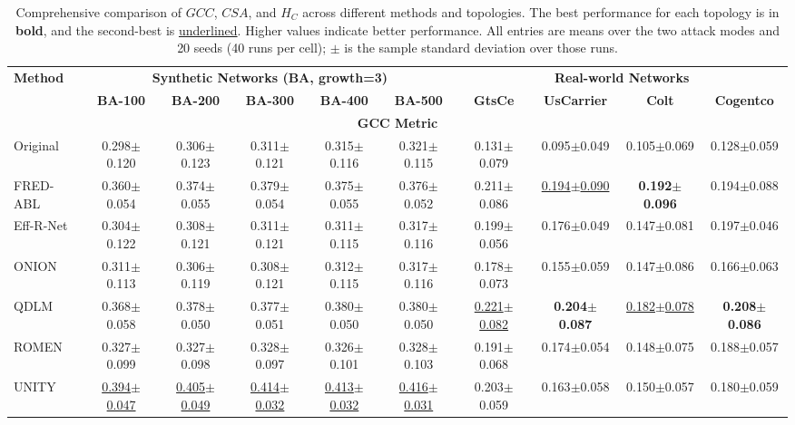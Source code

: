 \begin{table}[!ht]
\centering
\footnotesize
\setlength{\tabcolsep}{1.5pt}
\caption{Comprehensive comparison of $GCC$, $CSA$, and $H_C$ across different methods and topologies. The best performance for each topology is in \textbf{bold}, and the second-best is \underline{underlined}. Higher values indicate better performance. All entries are means over the two attack modes and 20 seeds (40 runs per cell); $\pm$ is the sample standard deviation over those runs.}
\label{tab:comprehensive_comparison}
\begin{tabular*}{\textwidth}{@{}l @{\extracolsep{\fill}} *{9}{c} @{}}
\toprule
\multirow{2}{*}{\textbf{Method}} & \multicolumn{5}{c}{\textbf{Synthetic Networks (BA, growth=3)}} & \multicolumn{4}{c}{\textbf{Real-world Networks}} \\
\cmidrule(lr){2-6} \cmidrule(l){7-10}
& \textbf{BA-100} & \textbf{BA-200} & \textbf{BA-300} & \textbf{BA-400} & \textbf{BA-500} & \textbf{GtsCe} & \textbf{UsCarrier} & \textbf{Colt} & \textbf{Cogentco} \\
\midrule
\multicolumn{10}{c}{\textbf{GCC Metric}} \\
\midrule
Original & 0.298$\pm$0.120 & 0.306$\pm$0.123 & 0.311$\pm$0.121 & 0.315$\pm$0.116 & 0.321$\pm$0.115 & 0.131$\pm$0.079 & 0.095$\pm$0.049 & 0.105$\pm$0.069 & 0.128$\pm$0.059 \\
FRED-ABL & 0.360$\pm$0.054 & 0.374$\pm$0.055 & 0.379$\pm$0.054 & 0.375$\pm$0.055 & 0.376$\pm$0.052 & 0.211$\pm$0.086 & \underline{0.194$\pm$0.090} & \textbf{0.192$\pm$0.096} & 0.194$\pm$0.088 \\
Eff-R-Net & 0.304$\pm$0.122 & 0.308$\pm$0.121 & 0.311$\pm$0.121 & 0.311$\pm$0.115 & 0.317$\pm$0.116 & 0.199$\pm$0.056 & 0.176$\pm$0.049 & 0.147$\pm$0.081 & 0.197$\pm$0.046 \\
ONION & 0.311$\pm$0.113 & 0.306$\pm$0.119 & 0.308$\pm$0.121 & 0.312$\pm$0.115 & 0.317$\pm$0.116 & 0.178$\pm$0.073 & 0.155$\pm$0.059 & 0.147$\pm$0.086 & 0.166$\pm$0.063 \\
QDLM & 0.368$\pm$0.058 & 0.378$\pm$0.050 & 0.377$\pm$0.051 & 0.380$\pm$0.050 & 0.380$\pm$0.050 & \underline{0.221$\pm$0.082} & \textbf{0.204$\pm$0.087} & \underline{0.182$\pm$0.078} & \textbf{0.208$\pm$0.086} \\
ROMEN & 0.327$\pm$0.099 & 0.327$\pm$0.098 & 0.328$\pm$0.097 & 0.326$\pm$0.101 & 0.328$\pm$0.103 & 0.191$\pm$0.068 & 0.174$\pm$0.054 & 0.148$\pm$0.075 & 0.188$\pm$0.057 \\
UNITY & \underline{0.394$\pm$0.047} & \underline{0.405$\pm$0.049} & \underline{0.414$\pm$0.032} & \underline{0.413$\pm$0.032} & \underline{0.416$\pm$0.031} & 0.203$\pm$0.059 & 0.163$\pm$0.058 & 0.150$\pm$0.057 & 0.180$\pm$0.059 \\

\end{tabular*}
\end{table}
